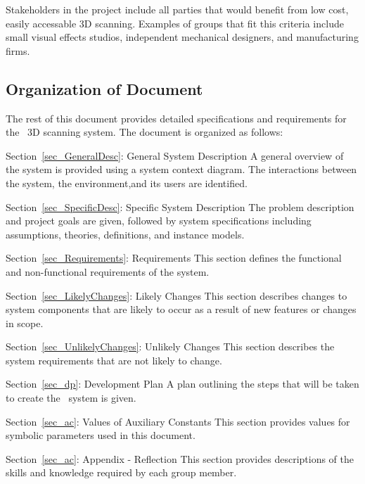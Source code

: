 \documentclass[12pt]{article}
\begin{document}
Stakeholders in the project include all parties that would benefit from low cost, easily accessable 3D scanning. Examples of groups that fit this criteria include small visual effects studios, independent mechanical designers, and manufacturing firms. 

\subsection{Organization of Document}

The rest of this document provides detailed specifications and requirements for the \progname\ 3D scanning system. The document is organized as follows:  
  
\noindent \begin{description}
\item Section~\ref{sec_GeneralDesc}: General System Description 
\newline
A general overview of the system is provided using a system context diagram. The interactions between the system, the environment,and its users are identified.
\item Section~\ref{sec_SpecificDesc}: Specific System Description 
\newline 
The problem description and project goals are given, followed by system specifications including assumptions, theories, definitions, and instance models.
\item Section~\ref{sec_Requirements}: Requirements
\newline
This section defines the functional and non-functional requirements of the system.
\item Section~\ref{sec_LikelyChanges}: Likely Changes
\newline
This section describes changes to system components that are likely to occur as a result of new features or changes in scope.
\item Section~\ref{sec_UnlikelyChanges}: Unlikely Changes 
\newline
This section describes the system requirements that are not likely to change.
\item Section~\ref{sec_dp}: Development Plan 
\newline
A plan outlining the steps that will be taken to create the \progname\ system is given.
\item Section~\ref{sec_ac}: Values of Auxiliary Constants 
\newline
This section provides values for symbolic parameters used in this document.
\item Section~\ref{sec_ac}: Appendix - Reflection 
\newline
This section provides descriptions of the skills and knowledge required by each group member.
\end{description}
\end{document}
